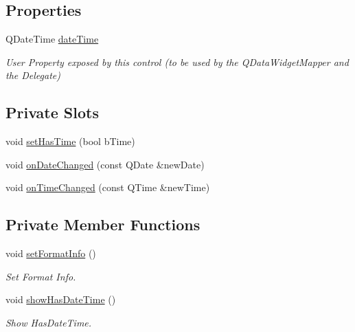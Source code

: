 \subsection*{Properties}
\begin{DoxyCompactItemize}
\item 
QDateTime \hyperlink{class_custom_time_ctrl_ad091ad8a573db0fdf17366547aab5695}{dateTime}
\begin{DoxyCompactList}\small\item\em User Property exposed by this control (to be used by the QDataWidgetMapper and the Delegate) \item\end{DoxyCompactList}\end{DoxyCompactItemize}
\subsection*{Private Slots}
\begin{DoxyCompactItemize}
\item 
void \hyperlink{class_custom_time_ctrl_ae8a64e667cf921232d5d940ef7a3fce1}{setHasTime} (bool bTime)
\item 
void \hyperlink{class_custom_time_ctrl_a753ef319f375e33ca45c68d6604130f6}{onDateChanged} (const QDate \&newDate)
\item 
void \hyperlink{class_custom_time_ctrl_ab25803203e9910a7d187450c4e1dc8d1}{onTimeChanged} (const QTime \&newTime)
\end{DoxyCompactItemize}
\subsection*{Private Member Functions}
\begin{DoxyCompactItemize}
\item 
void \hyperlink{class_custom_time_ctrl_ad1519295bb4900bc8c35a0885475140b}{setFormatInfo} ()
\begin{DoxyCompactList}\small\item\em Set Format Info. \item\end{DoxyCompactList}\item 
void \hyperlink{class_custom_time_ctrl_a049b8611ab15ec4ad46a93e7306ecc95}{showHasDateTime} ()
\begin{DoxyCompactList}\small\item\em Show HasDateTime. \item\end{DoxyCompactList}\end{DoxyCompactItemize}

